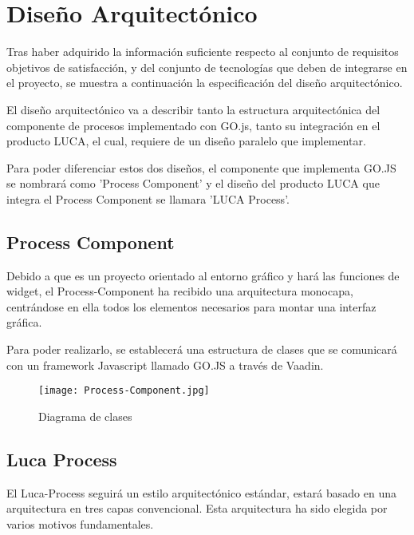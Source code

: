	\chapter{Diseño Arquitectónico}
	
	Tras haber adquirido la información suficiente respecto al conjunto de requisitos objetivos de satisfacción, y del conjunto de tecnologías que deben de integrarse en el proyecto, se muestra a continuación la especificación del diseño arquitectónico.
	
	\vspace{5mm}
	
	El diseño arquitectónico va a describir tanto la estructura arquitectónica del componente de procesos implementado con GO.js, tanto su integración en el producto LUCA, el cual, requiere de un diseño paralelo que implementar.
	
	
	\minitoc
	
	
	Para poder diferenciar estos dos diseños, el componente que implementa GO.JS se nombrará como 'Process Component' y el diseño del producto LUCA que integra el Process Component se llamara 'LUCA Process'.
	
		\section{Process Component}	
		
		Debido a que es un proyecto orientado al entorno gráfico y hará las funciones de widget, el Process-Component ha recibido una arquitectura monocapa, centrándose en ella todos los elementos necesarios para montar una interfaz gráfica.
		
		\vspace{5mm}
		
		Para poder realizarlo, se establecerá una estructura de clases que se comunicará con un framework Javascript llamado GO.JS a través de Vaadin.
			
		\begin{figure}[H]
			\centering
			\texttt{[image: Process-Component.jpg]}
			\caption{Diagrama de clases}\label{fig:Process-Component}
		\end{figure}
	
		
		
		\section{Luca Process}
		
		El Luca-Process seguirá un estilo arquitectónico estándar, estará basado en una arquitectura en tres capas convencional\cite{tres-capas}. Esta arquitectura ha sido elegida por varios motivos fundamentales.
		

